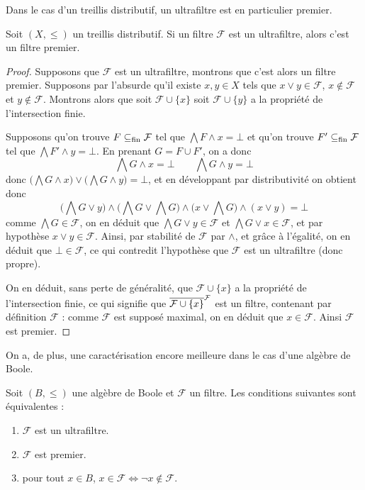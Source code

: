Dans le cas d'un treillis distributif, un ultrafiltre est en particulier
premier.

\begin{proposition}
  Soit $(X,\leq)$ un treillis distributif. Si un filtre $\mathcal F$ est un
  ultrafiltre, alors c'est un filtre premier.
\end{proposition}

\begin{proof}
  Supposons que $\mathcal F$ est un ultrafiltre, montrons que c'est alors un
  filtre premier. Supposons par l'absurde qu'il existe $x,y\in X$ tels que
  $x\lor y \in \mathcal F$, $x\notin\mathcal F$ et $y\notin\mathcal F$.
  Montrons alors que soit $\mathcal F\cup\{x\}$ soit $\mathcal F\cup\{y\}$ a la
  propriété de l'intersection finie.

  Supposons qu'on trouve $F\subseteq_{\mathrm{fin}} \mathcal F$ tel que
  $\bigwedge F \land x =\bot$ et qu'on trouve $F'\subseteq_{\mathrm{fin}}\mathcal F$ tel que
  $\bigwedge F' \land y = \bot$. En prenant $G = F \cup F'$, on a donc
  \[\bigwedge G \land x = \bot \qquad \bigwedge G \land y = \bot\]
  donc $\big(\bigwedge G \land x\big)\lor\big(\bigwedge G\land y\big) = \bot$,
  et en développant par distributivité on obtient donc
  \[\Bigg(\bigwedge G \lor y\Bigg)\land\Bigg(\bigwedge G\lor \bigwedge G\Bigg)
  \land \Bigg(x\lor \bigwedge G\Bigg)\land(x\lor y) = \bot\]
  comme $\bigwedge G\in \mathcal F$, on en déduit que
  $\bigwedge G \lor y \in \mathcal F$ et $\bigwedge G \lor x \in \mathcal F$,
  et par hypothèse $x\lor y \in \mathcal F$. Ainsi, par stabilité de
  $\mathcal F$ par $\land$, et grâce à l'égalité, on en déduit que
  $\bot\in\mathcal F$, ce qui contredit l'hypothèse que $\mathcal F$ est un
  ultrafiltre (donc propre).

  On en déduit, sans perte de généralité, que $\mathcal F\cup\{x\}$ a la
  propriété de l'intersection finie, ce qui signifie que
  $\overline{\mathcal F\cup\{x\}}^{\mathcal F}$ est un filtre, contenant par définition
  $\mathcal F$ : comme $\mathcal F$ est supposé maximal, on en déduit que
  $x\in \mathcal F$. Ainsi $\mathcal F$ est premier.
\end{proof}

On a, de plus, une caractérisation encore meilleure dans le cas d'une algèbre de
Boole.

\begin{proposition}
  Soit $(B,\leq)$ une algèbre de Boole et $\mathcal F$ un filtre. Les conditions
  suivantes sont équivalentes :
  \begin{enumerate}[label=(\roman*)]
  \item \label{enum.ultra.prim1} $\mathcal F$ est un ultrafiltre.
  \item \label{enum.ultra.prim2} $\mathcal F$ est premier.
  \item \label{enum.ultra.prim3} pour tout $x\in B$,
    $x\in \mathcal F \iff \lnot x \notin\mathcal F$.
  \end{enumerate}
\end{proposition}

